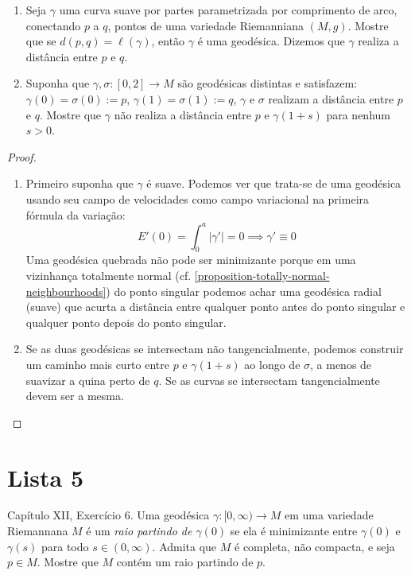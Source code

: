\begin{exercise}
\label{exercise-curvas-minimizantes}
\begin{enumerate}
\item Seja $\gamma$ uma curva suave por partes parametrizada por comprimento de
 arco, conectando $p$ a $q$, pontos de uma variedade Riemanniana $(M,g)$.
 Mostre que se $d(p,q)=\ell(\gamma)$, então $\gamma$ é uma geodésica.
 Dizemos que $\gamma$ realiza a distância entre $p$ e $q$.
\item Suponha que $\gamma,\sigma:[0,2]\to M$ são geodésicas distintas
 e satisfazem: $\gamma(0)=\sigma(0):=p$, $\gamma(1)=\sigma(1):=q$, 
$\gamma$ e $\sigma$ realizam a distância entre $p$ e $q$.
 Mostre que $\gamma$ não realiza a distância entre $p$ e $\gamma(1+s)$ 
para nenhum $s>0$.
\end{enumerate}
\end{exercise}

\begin{proof}
\begin{enumerate}
\item Primeiro suponha que $\gamma$ é suave. Podemos ver que trata-se de uma 
geodésica usando seu campo de velocidades como campo variacional na primeira
fórmula da variação:
$$
E'(0)=\int_0^a |\gamma'|=0 \implies \gamma'\equiv 0
$$
Uma geodésica quebrada não pode ser minimizante porque em uma vizinhança 
totalmente normal (cf. \ref{proposition-totally-normal-neighbourhoods}) 
do ponto singular podemos achar uma geodésica radial (suave)
 que acurta a distância entre qualquer ponto antes do ponto singular
 e qualquer ponto depois do ponto singular.
\item Se as duas geodésicas se intersectam não tangencialmente, podemos 
construir um caminho mais curto entre $p$ e $\gamma(1+s)$ ao longo de $\sigma$,
a menos de suavizar a quina perto de $q$. Se as curvas se intersectam
 tangencialmente devem ser a mesma.
\end{enumerate}
\end{proof}

\section{Lista 5}
\label{section-lista-5}

\begin{exercise}
\label{exercise-l5-5}
\cite{doc} Capítulo XII, Exercício 6. Uma geodésica $\gamma:[0,\infty)\to M$ em
uma variedade Riemannana $M$ é um {\it raio partindo de $\gamma(0)$} se ela é
minimizante entre $\gamma(0)$ e $\gamma(s)$ para todo  $s \in (0,\infty)$.
Admita que $M$ é completa, não compacta, e seja $p \in M$. Mostre que $M$ contém
um raio partindo de $p$.
\end{exercise}

